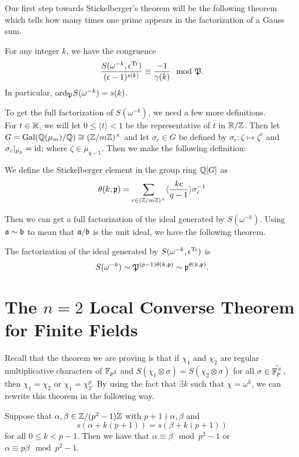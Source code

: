 Our first step towards Stickelberger's theorem will be the following theorem which tells how many times one prime appears in the factorization of a Gauss sum.
\begin{theorem}
For any integer $k$, we have the congruence 
\[\frac{S(\omega^{-k}, \epsilon^{\textrm{Tr}})}{(\epsilon - 1)^{s(k)}} \equiv \frac{-1}{\gamma(k)} \mod {\mathfrak{P}}.\]
In particular, $\textrm{ord}_{\mathfrak{P}} S(\omega^{-k}) = s(k)$.
\end{theorem}
To get the full factorization of $S(\omega^{-k})$, we need a few more definitions.\\

For $t \in \mathbb{R}$, we will let $0 \leq \langle t \rangle < 1$ be the representative of $t$ in $ \mathbb{R} / \mathbb{Z}$. 
Then let $G = \textrm{Gal}(\mathbb{Q}(\mu_m)/\mathbb{Q}) \cong (\mathbb{Z} / m\mathbb{Z})^\times$ and let $\sigma_c \in G$ be defined by $\sigma_c : \zeta \mapsto \zeta^c$ and $\sigma_c|_{\mu_p}  = \textrm{id}$; where $\zeta \in \mu_{q-1}$.
Then we make the following definition: 
\begin{defn}
We define the Stickelberger element in the group ring $\mathbb{Q}[G]$ as 
\[\theta(k,\mathfrak{p}) = \sum_{c \in (\mathbb{Z}/m\mathbb{Z})^\times} \langle \frac{kc}{q-1}\rangle \sigma_c^{-1}\]
\end{defn}
Then we can get a full factorization of the ideal generated by $S(\omega^{-k})$. Using $\mathfrak{a} \sim \mathfrak{b}$ to mean that $\mathfrak{a} / \mathfrak{b}$ is the unit ideal, we have the following theorem.
\begin{theorem}
The factorization of the ideal generated by $S(\omega^{-k}, \epsilon^{\textrm{Tr}})$ is \[S(\omega^{-k}) \sim \mathfrak{P}^{(p-1)\theta(k, \mathfrak{p})} \sim \mathfrak{p}^{\theta(k,\mathfrak{p})}.\]
\end{theorem}



\section{The $n=2$ Local Converse Theorem for Finite Fields}
Recall that the theorem we are proving is that if $\chi_1$ and $\chi_2$ are regular multiplicative characters of $\mathbb{F}_{p^2}$ and $S(\chi_1 \otimes \sigma) = S(\chi_2 \otimes \sigma)$ for all $\sigma \in \hat{\mathbb{F}_p^\times}$, then $\chi_1 = \chi_2$ or $\chi_1 = \chi_2^p$.
By using the fact that $\exists k$ such that $\chi = \omega^k$, we can rewrite this theorem in the following way.

\begin{theorem}
Suppose that $\alpha, \beta \in \mathbb{Z}/(p^2 -1)\mathbb{Z}$ with $p+1 \nmid \alpha, \beta$ and \[s(\alpha + k(p+1)) = s(\beta + k(p+1))\] for all $0 \leq k < p-1$. Then we have that $\alpha \equiv \beta \mod p^2 - 1$ or $\alpha \equiv p \beta \mod p^2 -1$.
\end{theorem}

\endinput